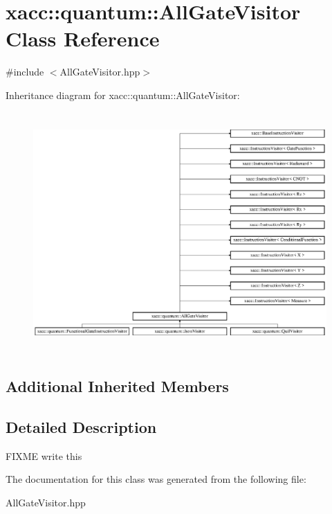 \hypertarget{a00014}{}\section{xacc\+:\+:quantum\+:\+:All\+Gate\+Visitor Class Reference}
\label{a00014}


{\ttfamily \#include $<$All\+Gate\+Visitor.\+hpp$>$}

Inheritance diagram for xacc\+:\+:quantum\+:\+:All\+Gate\+Visitor\+:\begin{figure}[H]
\begin{center}
\leavevmode
\includegraphics[height=9.201878cm]{a00014}
\end{center}
\end{figure}
\subsection*{Additional Inherited Members}


\subsection{Detailed Description}
F\+I\+X\+ME write this 

The documentation for this class was generated from the following file\+:\begin{DoxyCompactItemize}
\item 
All\+Gate\+Visitor.\+hpp\end{DoxyCompactItemize}
